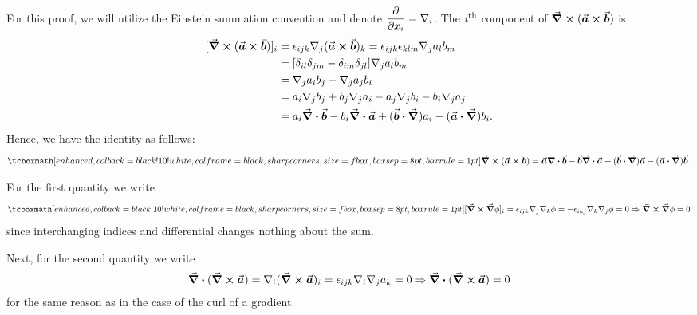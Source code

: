 For this proof, we will utilize the Einstein summation convention and denote $\displaystyle \pdv{x_{i}} = \nabla_{i}$.
The $i^{\rm th}$ component of $\curl{(\va*{a} \cross \va*{b})}$ is 
\begin{align}
    \label{eq:start-proof_2-3}
    [\curl{(\va*{a} \cross \va*{b})}]_{i} &= \epsilon_{ijk} \nabla_{j} (\va*{a} \cross \va*{b})_{k} = \epsilon_{ijk}\epsilon_{klm} \nabla_{j} a_{l} b_{m} \notag \\
                                          &= [\delta_{il}\delta_{jm} - \delta_{im}\delta_{jl}] \nabla_{j}a_{l}b_{m} \notag \\
                                          &= \nabla_{j} a_{i} b_{j} - \nabla_{j} a_{j} b_{i} \notag \\
                                          &= a_{i} \nabla_{j} b_{j} + b_{j} \nabla_{j} a_{i} - a_{j} \nabla_{j} b_{i} - b_{i} \nabla_{j} a_{j} \notag \\
                                          &= a_{i} \div{\va*{b}} - b_{i} \div{\va*{a}} + (\va*{b} \vdot \grad) a_{i} - (\va*{a} \vdot \grad) b_{i}
.\end{align}
Hence, we have the identity as follows:
\begin{eqnarray}
    \label{eq:identity-present}
    \eqbox{
    \curl{(\va*{a} \cross \va*{b})} = \va*{a} \div{\va*{b}} - \va*{b} \div{\va*{a}} + (\va*{b} \vdot \grad) \va*{a} - (\va*{a} \vdot \grad) \va*{b}
}
.\end{eqnarray}




For the first quantity we write
\begin{align}
    \label{eq:curl-gradient} 
    \eqbox{
    [\curl{\grad\phi}]_{i} = \epsilon_{ijk} \nabla_{j} \nabla_{k} \phi = -\epsilon_{ikj} \nabla_{k} \nabla_{j} \phi = 0 \Rightarrow \curl{\grad\phi} = 0
}
\end{align}
since interchanging indices and differential changes nothing about the sum.

Next, for the second quantity we write
\begin{align}
    \label{eq:div-curl}
    \div{(\curl{\va*{a}})} = \nabla_{i} (\curl{\va*{a}})_{i} = \epsilon_{ijk} \nabla_{i} \nabla_{j} a_{k} = 0 \Rightarrow \div{(\curl{\va*{a}})} = 0
\end{align}
for the same reason as in the case of the curl of a gradient.


